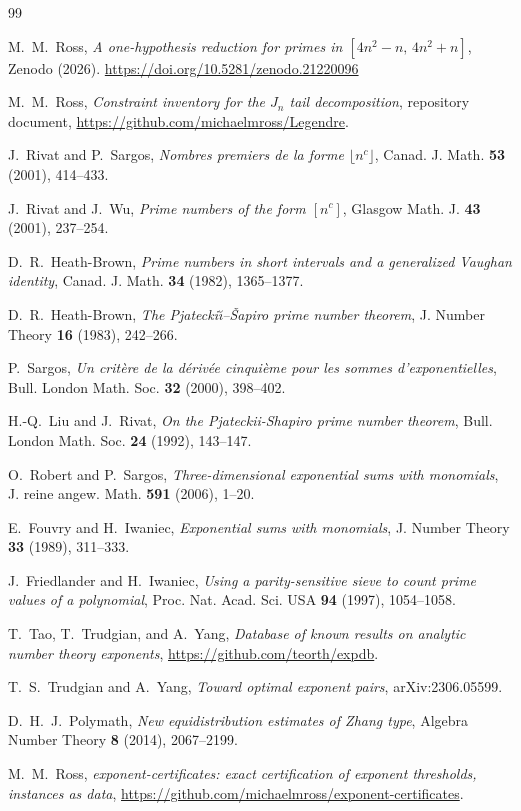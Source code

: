\documentclass[11pt]{article}
\begin{document}
\begin{thebibliography}{99}

M.~M.~Ross,
\emph{A one-hypothesis reduction for primes in $[4n^2-n,\,4n^2+n]$},
Zenodo (2026). \url{https://doi.org/10.5281/zenodo.21220096}

M.~M.~Ross,
\emph{Constraint inventory for the $J_n$ tail decomposition},
repository document, \url{https://github.com/michaelmross/Legendre}.

J.~Rivat and P.~Sargos,
\emph{Nombres premiers de la forme $\lfloor n^c\rfloor$},
Canad. J. Math. \textbf{53} (2001), 414--433.

J.~Rivat and J.~Wu,
\emph{Prime numbers of the form $[n^c]$},
Glasgow Math. J. \textbf{43} (2001), 237--254.

D.~R.~Heath-Brown,
\emph{Prime numbers in short intervals and a generalized Vaughan
identity}, Canad. J. Math. \textbf{34} (1982), 1365--1377.

D.~R.~Heath-Brown,
\emph{The Pjatecki\u{\i}--\v{S}apiro prime number theorem},
J. Number Theory \textbf{16} (1983), 242--266.

P.~Sargos,
\emph{Un crit\`ere de la d\'eriv\'ee cinqui\`eme pour les sommes
d'exponentielles}, Bull. London Math. Soc. \textbf{32} (2000),
398--402.

H.-Q.~Liu and J.~Rivat,
\emph{On the Pjateckii-Shapiro prime number theorem},
Bull. London Math. Soc. \textbf{24} (1992), 143--147.

O.~Robert and P.~Sargos,
\emph{Three-dimensional exponential sums with monomials},
J. reine angew. Math. \textbf{591} (2006), 1--20.

E.~Fouvry and H.~Iwaniec,
\emph{Exponential sums with monomials},
J. Number Theory \textbf{33} (1989), 311--333.

J.~Friedlander and H.~Iwaniec,
\emph{Using a parity-sensitive sieve to count prime values of a
polynomial}, Proc. Nat. Acad. Sci. USA \textbf{94} (1997), 1054--1058.

T.~Tao, T.~Trudgian, and A.~Yang,
\emph{Database of known results on analytic number theory exponents},
\url{https://github.com/teorth/expdb}.

T.~S.~Trudgian and A.~Yang,
\emph{Toward optimal exponent pairs},
arXiv:2306.05599.

D.~H.~J.~Polymath,
\emph{New equidistribution estimates of Zhang type},
Algebra Number Theory \textbf{8} (2014), 2067--2199.

M.~M.~Ross,
\emph{exponent-certificates: exact certification of exponent
thresholds, instances as data},
\url{https://github.com/michaelmross/exponent-certificates}.

\end{thebibliography}
\end{document}
